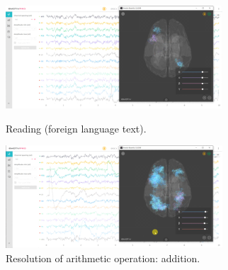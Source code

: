 \documentclass[english]{textolivre}
\begin{document}
\begin{figure}[htbp]
 \centering
 \begin{minipage}{.45\textwidth}
 \includegraphics[width=\textwidth]{Fig6.png}
 \caption{Reading (foreign language text).}
 \label{fig06}
 \end{minipage}%
 \qquad
 \begin{minipage}{0.45\textwidth}
 \includegraphics[width=\textwidth]{Fig7.png}
 \caption{Resolution of arithmetic operation: addition.}
 \label{fig07}
 \end{minipage}%
\end{figure}
\end{document}
